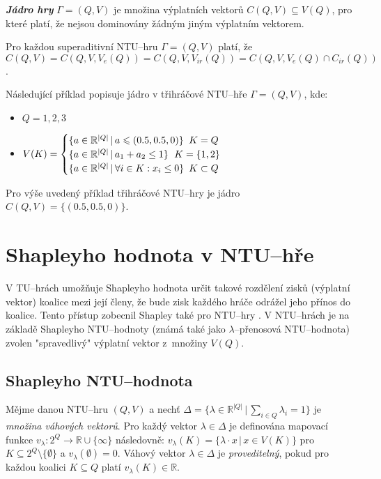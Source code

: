         \textit{\textbf{Jádro hry}} $\Gamma = (Q, V)$ je množina výplatních vektorů $C(Q, V) \subseteq V(Q)$, pro které platí, že nejsou dominovány žádným jiným výplatním vektorem.

        Pro každou superaditivní NTU--hru $\Gamma = (Q, V)$ platí, že $C(Q, V) = C(Q, V, V_e(Q)) = C(Q, V, V_{ir}(Q)) = C(Q, V, V_e(Q) \cap C_{ir}(Q))$.

        Následující příklad popisuje jádro v třihráčové NTU--hře $\Gamma = (Q, V)$, kde:

        \begin{itemize}
            \vspace*{-0.3em}
            \item $Q = 1, 2, 3$
            \item $V(K) = \begin{cases}
                \{a \in \mathbb{R}^{|Q|}\,|\, a \leqslant (0.5, 0.5, 0)\} & \hspace*{-0.5em}K = Q\\
                \{a \in \mathbb{R}^{|Q|}\,|\, a_1 + a_2 \leq 1\} & \hspace*{-2em}K = \{1, 2\}\\
                \{a \in \mathbb{R}^{|Q|}\,|\, \forall i \in K: x_i \leq 0\} & \hspace*{-0.5em}K \subset Q
            \end{cases}$
        \end{itemize}

        Pro výše uvedený příklad třihráčové NTU--hry je jádro $C(Q, V) = \{(0.5, 0.5, 0)\}$.

\section{Shapleyho hodnota v NTU--hře}
    \label{sec:Shapley}
    V TU--hrách umožňuje Shapleyho hodnota \cite{Shapley1953} určit takové rozdělení zisků (výplatní vektor) koalice mezi její členy, že bude zisk každého hráče odrážel jeho přínos do koalice. Tento přístup zobecnil Shapley také pro NTU--hry \cite{Shapley1969}. V NTU--hrách je na základě Shapleyho NTU--hodnoty (známá také jako $\lambda$--přenosová NTU--hodnota) zvolen "spravedlivý" výplatní vektor z~množiny $V(Q)$.

    \subsection{Shapleyho NTU--hodnota}
        Mějme danou NTU--hru $(Q, V)$ a nechť $\Delta = \{\lambda \in \mathbb{R}^{|Q|}\,|\, \sum_{i\in Q}\lambda_i = 1\}$ je \textit{množina váhových vektorů}. Pro každý vektor $\lambda \in \Delta$ je definována mapovací funkce $v_\lambda: 2^Q \rightarrow \mathbb{R} \cup \{\infty\}$ následovně: $v_\lambda(K) = \{\lambda \cdot x\,|\, x \in V(K)\}$ pro $K \subseteq 2^Q \setminus \{\emptyset\}$ a $v_\lambda(\emptyset) = 0$. Váhový vektor $\lambda \in \Delta$ je \textit{proveditelný}, pokud pro každou koalici $K \subseteq Q$ platí $v_\lambda(K) \in \mathbb{R}$.

